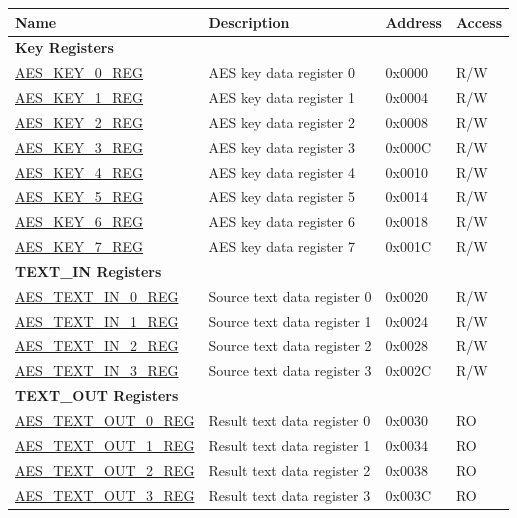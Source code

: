 \newif\ifaeslatest
\iftagged{ESP32-P4-latest}{\aeslatesttrue}{\aeslatestfalse}
\begin{longtable}{ | l | l | l | l | }
\hline\rowcolor{lightgray}
\textbf{Name} & \textbf{Description} &  \textbf{Address} & \textbf{Access} \\ \hline
\multicolumn{4}{|l|}{\textbf{Key Registers}} \\ \hline

\hyperref[regdesc:AESKEYnREG]{AES\_KEY\_0\_REG}				&	AES key data register 0				& 0x0000 & R/W \\ \hline
\hyperref[regdesc:AESKEYnREG]{AES\_KEY\_1\_REG}				&	AES key data register 1				& 0x0004 & R/W \\ \hline
\hyperref[regdesc:AESKEYnREG]{AES\_KEY\_2\_REG}				&	AES key data register 2				& 0x0008 & R/W \\ \hline
\hyperref[regdesc:AESKEYnREG]{AES\_KEY\_3\_REG}				&	AES key data register 3				& 0x000C & R/W \\ \hline
\hyperref[regdesc:AESKEYnREG]{AES\_KEY\_4\_REG}				&	AES key data register 4				& 0x0010 & R/W \\ \hline
\hyperref[regdesc:AESKEYnREG]{AES\_KEY\_5\_REG}				&	AES key data register 5				& 0x0014 & R/W \\ \hline
\hyperref[regdesc:AESKEYnREG]{AES\_KEY\_6\_REG}				&	AES key data register 6				& 0x0018 & R/W \\ \hline
\hyperref[regdesc:AESKEYnREG]{AES\_KEY\_7\_REG}				&	AES key data register 7				& 0x001C & R/W \\ \hline

\multicolumn{4}{|l|}{\textbf{TEXT\_IN Registers}} \\ \hline

\hyperref[regdesc:AESTEXTINnREG]{AES\_TEXT\_IN\_0\_REG}			&	Source text data register 0					& 0x0020 & R/W \\ \hline
\hyperref[regdesc:AESTEXTINnREG]{AES\_TEXT\_IN\_1\_REG}			&	Source text data register 1					& 0x0024 & R/W \\ \hline
\hyperref[regdesc:AESTEXTINnREG]{AES\_TEXT\_IN\_2\_REG}			&	Source text data register 2					& 0x0028 & R/W \\ \hline
\hyperref[regdesc:AESTEXTINnREG]{AES\_TEXT\_IN\_3\_REG}			&	Source text data register 3					& 0x002C & R/W \\ \hline

\multicolumn{4}{|l|}{\textbf{TEXT\_OUT Registers}} \\ \hline

\hyperref[regdesc:AESTEXTOUTnREG]{AES\_TEXT\_OUT\_0\_REG}		&	Result text data register 0					& 0x0030 & RO \\ \hline
\hyperref[regdesc:AESTEXTOUTnREG]{AES\_TEXT\_OUT\_1\_REG}		&	Result text data register 1					& 0x0034 & RO \\ \hline
\hyperref[regdesc:AESTEXTOUTnREG]{AES\_TEXT\_OUT\_2\_REG}		&	Result text data register 2					& 0x0038 & RO \\ \hline
\hyperref[regdesc:AESTEXTOUTnREG]{AES\_TEXT\_OUT\_3\_REG}		&	Result text data register 3					& 0x003C & RO \\ \hline


\end{longtable}
